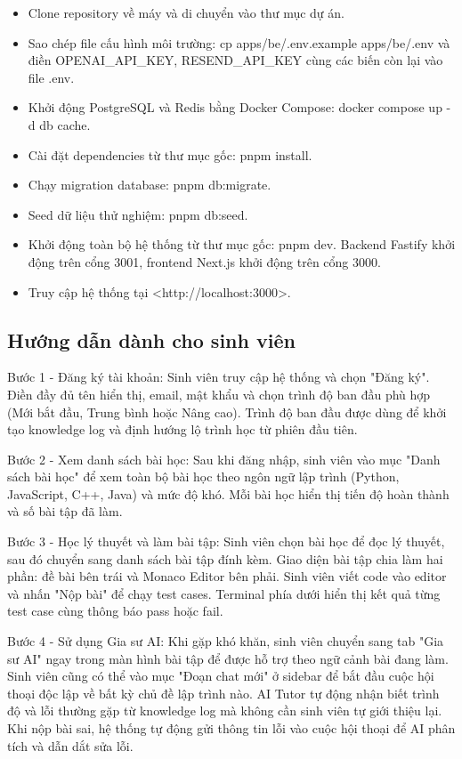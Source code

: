 \documentclass[../main.tex]{subfiles}
\begin{document}
\begin{itemize}
    \item Clone repository về máy và di chuyển vào thư mục dự án.
    \item Sao chép file cấu hình môi trường: cp apps/be/.env.example apps/be/.env và điền OPENAI\_API\_KEY, RESEND\_API\_KEY cùng các biến còn lại vào file .env.
    \item Khởi động PostgreSQL và Redis bằng Docker Compose: docker compose up -d db cache.
    \item Cài đặt dependencies từ thư mục gốc: pnpm install.
    \item Chạy migration database: pnpm db:migrate.
    \item Seed dữ liệu thử nghiệm: pnpm db:seed.
    \item Khởi động toàn bộ hệ thống từ thư mục gốc: pnpm dev. Backend Fastify khởi động trên cổng 3001, frontend Next.js khởi động trên cổng 3000.
    \item Truy cập hệ thống tại <http://localhost:3000>.
\end{itemize}

\subsection{Hướng dẫn dành cho sinh viên}

Bước 1 - Đăng ký tài khoản: Sinh viên truy cập hệ thống và chọn "Đăng ký". Điền đầy đủ tên hiển thị, email, mật khẩu và chọn trình độ ban đầu phù hợp (Mới bắt đầu, Trung bình hoặc Nâng cao). Trình độ ban đầu được dùng để khởi tạo knowledge log và định hướng lộ trình học từ phiên đầu tiên.

Bước 2 - Xem danh sách bài học: Sau khi đăng nhập, sinh viên vào mục "Danh sách bài học" để xem toàn bộ bài học theo ngôn ngữ lập trình (Python, JavaScript, C++, Java) và mức độ khó. Mỗi bài học hiển thị tiến độ hoàn thành và số bài tập đã làm.

Bước 3 - Học lý thuyết và làm bài tập: Sinh viên chọn bài học để đọc lý thuyết, sau đó chuyển sang danh sách bài tập đính kèm. Giao diện bài tập chia làm hai phần: đề bài bên trái và Monaco Editor bên phải. Sinh viên viết code vào editor và nhấn "Nộp bài" để chạy test cases. Terminal phía dưới hiển thị kết quả từng test case cùng thông báo pass hoặc fail.

Bước 4 - Sử dụng Gia sư AI: Khi gặp khó khăn, sinh viên chuyển sang tab "Gia sư AI" ngay trong màn hình bài tập để được hỗ trợ theo ngữ cảnh bài đang làm. Sinh viên cũng có thể vào mục "Đoạn chat mới" ở sidebar để bắt đầu cuộc hội thoại độc lập về bất kỳ chủ đề lập trình nào. AI Tutor tự động nhận biết trình độ và lỗi thường gặp từ knowledge log mà không cần sinh viên tự giới thiệu lại. Khi nộp bài sai, hệ thống tự động gửi thông tin lỗi vào cuộc hội thoại để AI phân tích và dẫn dắt sửa lỗi.
\end{document}
